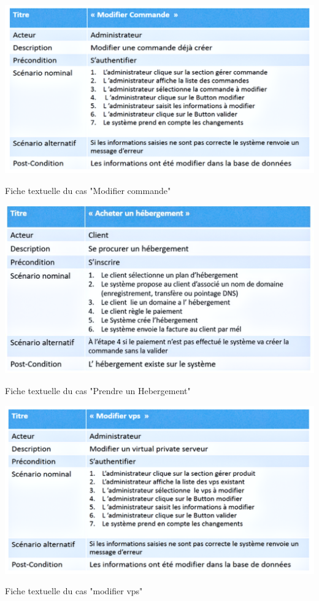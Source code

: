 \documentclass[a4paper, 12pt]{report}
\begin{document}
\begin{table}[H]
	\centering
	\includegraphics{img/fiche/18}
	\caption{Fiche textuelle du cas "Modifier commande"}
	\label{Tux}
\end{table}
\begin{table}[H]
	\centering
	\includegraphics{img/fiche/19}
	\caption{Fiche textuelle du cas "Prendre un Hebergement"}
	\label{Tux}
\end{table}
\begin{table}[H]
	\centering
	\includegraphics{img/fiche/20}
	\caption{Fiche textuelle du cas "modifier vps"}
	\label{Tux}
\end{table}
\end{document}
